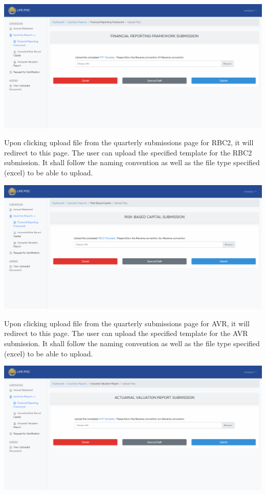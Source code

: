 \documentclass{article}
\begin{document}
\includegraphics[keepaspectratio=true]{up-ic-screens/image29}{}%

Upon clicking upload file from the quarterly
submissions page for RBC2, it will redirect to this page. The user can
upload the specified template for the RBC2 submission. It shall follow
the naming convention as well as the file type specified (excel) to be
able to upload.%

\includegraphics[keepaspectratio=true]{up-ic-screens/image85}{}%

Upon clicking upload file from the quarterly
submissions page for AVR, it will redirect to this page. The user can
upload the specified template for the AVR submission. It shall follow
the naming convention as well as the file type specified (excel) to be
able to upload.%

\includegraphics[keepaspectratio=true]{up-ic-screens/image126}{}%
\end{document}
